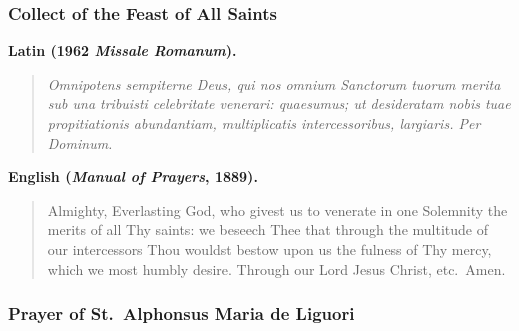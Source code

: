 \subsubsection*{Collect of the Feast of All Saints}

\textbf{Latin (1962 \textit{Missale Romanum}).}

\begin{quote}
\textit{Omnipotens sempiterne Deus, qui nos omnium Sanctorum tuorum merita sub una tribuisti celebritate venerari: quaesumus; ut desideratam nobis tuae propitiationis abundantiam, multiplicatis intercessoribus, largiaris. Per Dominum.}
\end{quote}

\textbf{English (\textit{Manual of Prayers}, 1889).}

\begin{quote}
Almighty, Everlasting God, who givest us to venerate in one Solemnity the merits of all Thy saints: we beseech Thee that through the multitude of our intercessors Thou wouldst bestow upon us the fulness of Thy mercy, which we most humbly desire. Through our Lord Jesus Christ, etc.\ Amen.
\end{quote}

\subsubsection*{Prayer of St.\ Alphonsus Maria de Liguori}

